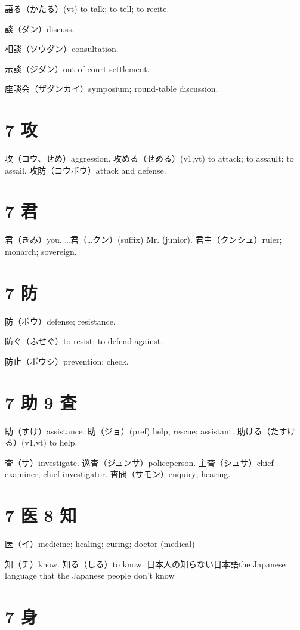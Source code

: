 語る（かたる）(vt) to talk; to tell; to recite.

談（ダン）discuss.

相談（ソウダン）consultation.

示談（ジダン）out-of-court settlement.

座談会（ザダンカイ）symposium; round-table discussion.

\section{7 攻}

攻（コウ、せめ）aggression.
攻める（せめる）(v1,vt) to attack; to assault; to assail.
攻防（コウボウ）attack and defense.

\section{7 君}

君（きみ）you.
…君（…クン）(suffix) Mr. (junior).
君主（クンシュ）ruler; monarch; sovereign.

\section{7 防}

防（ボウ）defense; resistance.

防ぐ（ふせぐ）to resist; to defend against.

防止（ボウシ）prevention; check.

\section{7 助 9 査}

助（すけ）assistance.
助（ジョ）(pref) help; rescue; assistant.
助ける（たすける）(v1,vt) to help.

査（サ）investigate.
巡査（ジュンサ）policeperson.
主査（シュサ）chief examiner; chief investigator.
査問（サモン）enquiry; hearing.

\section{7 医 8 知}

医（イ）medicine; healing; curing; doctor (medical)

知（チ）know.
知る（しる）to know.
日本人の知らない日本語the Japanese language that the Japanese people don't know

\section{7 身}

